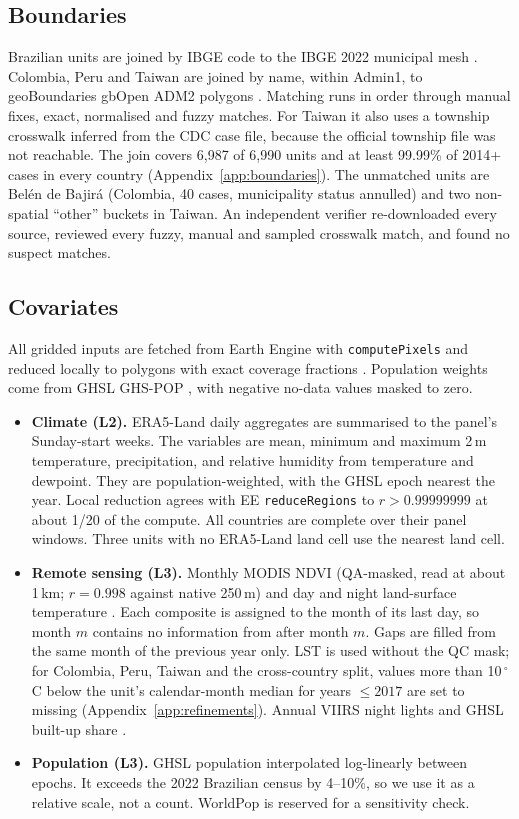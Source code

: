\documentclass[11pt]{article}
\begin{document}
\subsection{Boundaries}
Brazilian units are joined by IBGE code to the IBGE 2022 municipal mesh \citep{ibge2022malha}.
Colombia, Peru and Taiwan are joined by name, within Admin1, to geoBoundaries gbOpen ADM2
polygons \citep{geoboundaries_gbopen}. Matching runs in order through manual fixes, exact,
normalised and fuzzy matches. For Taiwan it also uses a township crosswalk inferred from the CDC case file,
because the official township file was not reachable. The join covers 6{,}987 of 6{,}990 units
and at least 99.99\% of 2014+ cases in every country (Appendix~\ref{app:boundaries}). The
unmatched units are Bel\'en de Bajir\'a (Colombia, 40 cases, municipality status annulled) and
two non-spatial ``other'' buckets in Taiwan. An independent verifier re-downloaded every source,
reviewed every fuzzy, manual and sampled crosswalk match, and found no suspect matches.

\subsection{Covariates}
\label{sec:covariates}
All gridded inputs are fetched from Earth Engine \citep{gorelick2017gee} with
\texttt{computePixels} and reduced locally to polygons with exact coverage fractions
\citep{baston_exactextract}. Population weights come from GHSL GHS-POP \citep{ghsl_pop}, with
negative no-data values masked to zero.
\begin{itemize}
  \item \textbf{Climate (L2).} ERA5-Land daily aggregates \citep{era5land_ee} are summarised to the panel's
  Sunday-start weeks. The variables are mean, minimum and maximum 2\,m temperature, precipitation, and
  relative humidity from temperature and dewpoint. They are population-weighted, with the GHSL epoch
  nearest the year. Local reduction agrees with EE \texttt{reduceRegions} to $r>0.99999999$ at about
  1/20 of the compute. All countries are complete over their panel windows. Three units with no ERA5-Land land cell use the
  nearest land cell.
  \item \textbf{Remote sensing (L3).} Monthly MODIS NDVI \citep{mod13q1_ee} (QA-masked, read
  at about 1\,km; $r=0.998$ against native 250\,m) and day and night land-surface temperature
  \citep{mod11a2_ee}. Each composite is assigned to the month of its last day, so month $m$ contains
  no information from after month $m$. Gaps are filled from the same month of the previous year only.
  LST is used without the QC mask; for Colombia, Peru, Taiwan and the cross-country split, values more
  than 10\,$^\circ$C below the unit's calendar-month median for years $\leq 2017$ are set to missing
  (Appendix~\ref{app:refinements}).
  Annual VIIRS night lights \citep{viirs_ee} and GHSL built-up share \citep{ghsl_built}.
  \item \textbf{Population (L3).} GHSL population interpolated log-linearly between epochs.
  It exceeds the 2022 Brazilian census by 4--10\%, so we use it as a relative scale, not a count.
  WorldPop \citep{worldpop_r2025a} is reserved for a sensitivity check.
\end{itemize}
\end{document}
